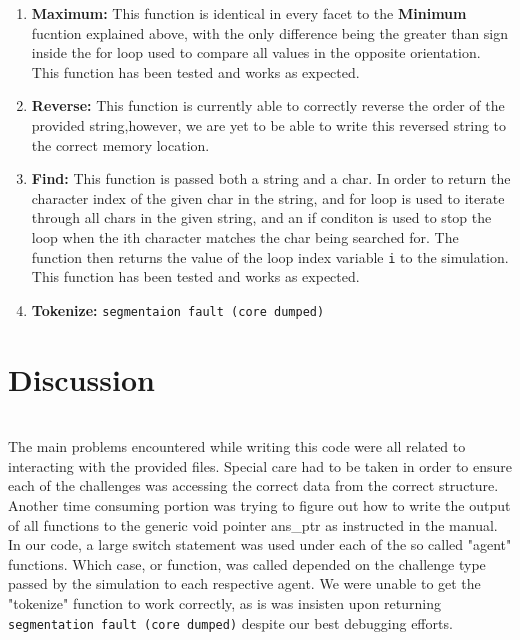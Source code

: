 \documentclass[11pt]{report}
\newcommand{\code}[1]{\colorbox{light-gray}{\texttt{#1}}}
\begin{document}
\begin{enumerate}
    \item \textbf{Maximum:} This function is identical in every facet to the \textbf{Minimum} fucntion explained above, with the only difference being the greater than sign inside the for loop used to compare all values in the opposite orientation. This function has been tested and works as expected.
    \item \textbf{Reverse:} This function is currently able to correctly reverse the order of the provided string,however, we are yet to be able to write this reversed string to the correct memory location.
    \item \textbf{Find:} This function is passed both a string and a char. In order to return the character index of the given char in the string, and for loop is used to iterate through all chars in the given string, and an if conditon is used to stop the loop when the ith character matches the char being searched for. The function then returns the value of the loop index variable \code{i} to the simulation. This function has been tested and works as expected.
    \item \textbf{Tokenize:} \code{segmentaion fault (core dumped)}
\end{enumerate}
\section{Discussion}
\\The main problems encountered while writing this code were all related to interacting with the provided files. Special care had to be taken in order to ensure each of the challenges was accessing the correct data from the correct structure. Another time consuming portion was trying to figure out how to write the output of all functions to the generic void pointer ans\_ptr as instructed in the manual. In our code, a large switch statement was used under each of the so called "agent" functions. Which case, or function, was called depended on the challenge type passed by the simulation to each respective agent. We were unable to get the "tokenize" function to work correctly, as is was insisten upon returning \code{segmentation fault (core dumped)} despite our best debugging efforts.
\newpage
\end{document}
